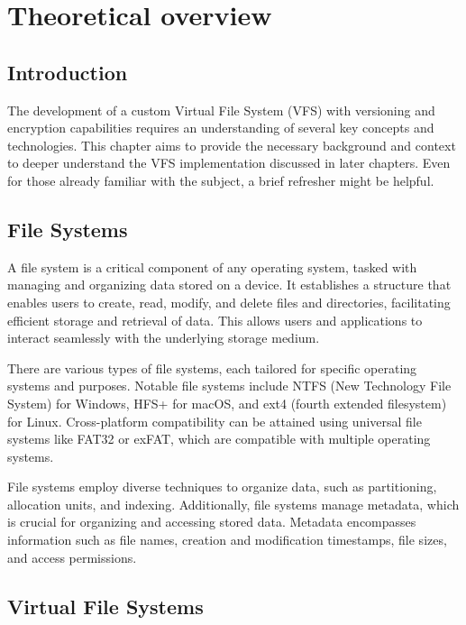 \chapter{Theoretical overview}
\label{chap:refs}


\section{Introduction}\label{sec:introduction}

The development of a custom Virtual File System (VFS) with versioning and encryption capabilities requires an understanding of several key concepts and technologies.
This chapter aims to provide the necessary background and context to deeper understand the VFS implementation discussed in later chapters.
Even for those already familiar with the subject, a brief refresher might be helpful.

\section{File Systems}\label{sec:file-systems}

A file system is a critical component of any operating system, tasked with managing and organizing data stored on a device.
It establishes a structure that enables users to create, read, modify, and delete files and directories, facilitating efficient storage and retrieval of data.
This allows users and applications to interact seamlessly with the underlying storage medium.

There are various types of file systems, each tailored for specific operating systems and purposes.
Notable file systems include NTFS (New Technology File System) for Windows, HFS+ for macOS, and ext4 (fourth extended filesystem) for Linux.
Cross-platform compatibility can be attained using universal file systems like FAT32 or exFAT, which are compatible with multiple operating systems.

File systems employ diverse techniques to organize data, such as partitioning, allocation units, and indexing.
Additionally, file systems manage metadata, which is crucial for organizing and accessing stored data.
Metadata encompasses information such as file names, creation and modification timestamps, file sizes, and access permissions.

\section{Virtual File Systems}\label{sec:virtual-file-systems}

